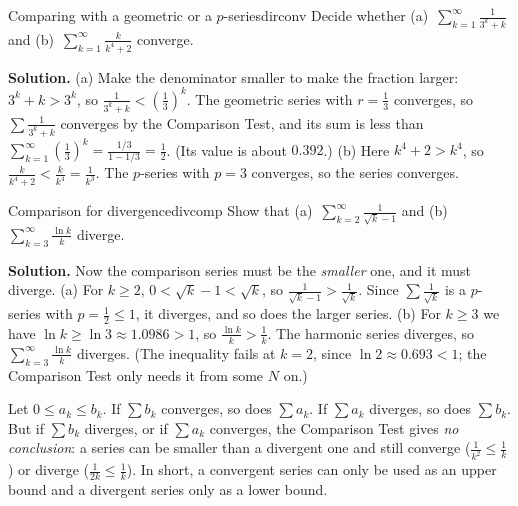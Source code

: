 \documentclass[11pt]{article}
\begin{document}
\begin{exmp}{Comparing with a geometric or a $p$-series}{dirconv}
Decide whether (a)~$\displaystyle\sum_{k=1}^\infty\frac1{3^k+k}$ and (b)~$\displaystyle\sum_{k=1}^\infty\frac k{k^4+2}$ converge.

\textbf{Solution.} (a) Make the denominator smaller to make the fraction larger: $3^k+k>3^k$, so $\frac1{3^k+k}<\left(\frac13\right)^k$. The geometric series with $r=\frac13$ converges, so $\sum\frac1{3^k+k}$ converges by the Comparison Test, and its sum is less than $\sum_{k=1}^\infty\left(\frac13\right)^k=\frac{1/3}{1-1/3}=\frac12$. (Its value is about $0.392$.)
(b) Here $k^4+2>k^4$, so $\frac k{k^4+2}<\frac k{k^4}=\frac1{k^3}$. The $p$-series with $p=3$ converges, so the series converges.
\end{exmp}

\begin{exmp}{Comparison for divergence}{divcomp}
Show that (a)~$\displaystyle\sum_{k=2}^\infty\frac1{\sqrt k-1}$ and (b)~$\displaystyle\sum_{k=3}^\infty\frac{\ln k}k$ diverge.

\textbf{Solution.} Now the comparison series must be the \emph{smaller} one, and it must diverge. (a) For $k\ge2$, $0<\sqrt k-1<\sqrt k$, so $\frac1{\sqrt k-1}>\frac1{\sqrt k}$. Since $\sum\frac1{\sqrt k}$ is a $p$-series with $p=\frac12\le1$, it diverges, and so does the larger series.
(b) For $k\ge3$ we have $\ln k\ge\ln3\approx1.0986>1$, so $\frac{\ln k}k>\frac1k$. The harmonic series diverges, so $\sum_{k=3}^\infty\frac{\ln k}k$ diverges. (The inequality fails at $k=2$, since $\ln2\approx0.693<1$; the Comparison Test only needs it from some $N$ on.)
\end{exmp}

\begin{remark}
Let $0\le a_k\le b_k$. If $\sum b_k$ converges, so does $\sum a_k$. If $\sum a_k$ diverges, so does $\sum b_k$. But if $\sum b_k$ diverges, or if $\sum a_k$ converges, the Comparison Test gives \emph{no conclusion}: a series can be smaller than a divergent one and still converge ($\frac1{k^2}\le\frac1k$) or diverge ($\frac1{2k}\le\frac1k$). In short, a convergent series can only be used as an upper bound and a divergent series only as a lower bound.
\end{remark}
\end{document}
